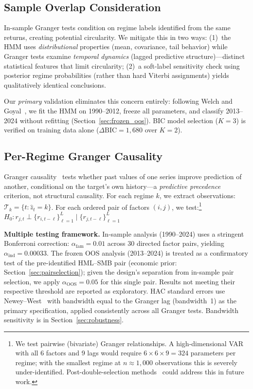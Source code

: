 \documentclass[sigconf,anonymous]{acmart}
\begin{document}
\subsection{Sample Overlap Consideration}

In-sample Granger tests condition on regime labels identified from the same returns,
creating potential circularity. We mitigate this in two ways: (1)~the HMM uses
\emph{distributional} properties (mean, covariance, tail behavior) while Granger
tests examine \emph{temporal dynamics} (lagged predictive structure)---distinct
statistical features that limit circularity; (2)~a soft-label sensitivity check
using posterior regime probabilities (rather than hard Viterbi assignments) yields
qualitatively identical conclusions.

Our \emph{primary} validation eliminates this concern entirely: following
Welch and Goyal~\cite{welch2008comprehensive}, we fit the HMM on 1990--2012,
freeze all parameters, and classify 2013--2024 without refitting
(Section~\ref{sec:frozen_oos}). BIC model selection ($K=3$) is verified on
training data alone ($\Delta\text{BIC} = 1{,}680$ over $K=2$).

\subsection{Per-Regime Granger Causality}
\label{sec:granger_method}

Granger causality~\cite{granger1969investigating,shojaie2022granger} tests whether past values
of one series improve prediction of another, conditional on the target's own history---a
\emph{predictive precedence} criterion, not structural causality.
For each regime $k$, we extract observations: $\mathcal{T}_k = \{t : \hat{z}_t = k\}$.
For each ordered pair of factors $(i, j)$, we test:\footnote{We test pairwise
(bivariate) Granger relationships. A high-dimensional VAR with all 6 factors and 9 lags
would require $6 \times 6 \times 9 = 324$ parameters per regime; with the smallest regime
at $n \approx 1{,}000$ observations this is severely under-identified. Post-double-selection
methods~\cite{hecq2023granger} could address this in future work.}
$H_0: r_{j,t} \perp \{r_{i,t-\ell}\}_{\ell=1}^{L} \mid \{r_{j,t-\ell}\}_{\ell=1}^{L}$

\textbf{Multiple testing framework.}
In-sample analysis (1990--2024) uses a stringent Bonferroni correction:
$\alpha_{\text{fam}} = 0.01$ across 30 directed factor pairs, yielding
$\alpha_{\text{ind}} = 0.00033$. The frozen OOS analysis (2013--2024) is treated
as a confirmatory test of the pre-identified HML--SMB pair (economic prior:
Section~\ref{sec:pairselection}); given the design's separation from in-sample
pair selection, we apply $\alpha_{\text{OOS}} = 0.05$ for this single pair.
Results not meeting their respective threshold are reported as exploratory. HAC standard errors use Newey--West~\cite{newey1987simple}
with bandwidth equal to the Granger lag (bandwidth~1) as the primary specification,
applied consistently across all Granger tests. Bandwidth sensitivity is in
Section~\ref{sec:robustness}.
\end{document}
